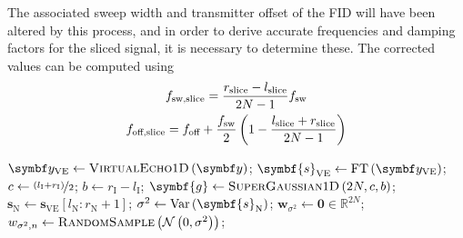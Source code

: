 The associated sweep width and transmitter offset of the \ac{FID} will have
been altered by this process, and in order to derive accurate frequencies and
damping factors for the sliced signal, it is necessary to determine these. The
corrected values can be computed using
\begin{subequations}
    \begin{gather}
        f_{\text{sw,slice}} = \frac{r_{\text{slice}} - l_{\text{slice}}}{2N - 1} f_{\mathrm{sw}}\\
        f_{\text{off,slice}} = f_{\text{off}} + \frac{f_{\mathrm{sw}}}{2} \left(
            1 - \frac{l_{\text{slice}} + r_{\text{slice}}}{2N - 1}
        \right)
    \end{gather}
\end{subequations}

\begin{algorithm}
    \begin{algorithmic}
        \caption[
            The filtering procedure for 1D data.
        ]
        {
            The filtering procedure for 1D data.
            $l/r_{\text{I/N}}$ denotes the left ($l$)/right ($r$) bound of the
            region of interest (I)/noise region (N), as a vector index.
            All of these values should be members of the set $\lbrace 0,
            \cdots, 2N - 1 \rbrace$.
            These would typically be provided in units of \unit{\hertz} or
            \unit{\partspermillion} by a user; conversion to indices can
            be carried out using \cref{eq:fidx}.
        }
        \label{alg:filter-1d}
            \State $\by_{\text{VE}} \gets \textsc{VirtualEcho$1$D}\left(\by\right)$;
            \State $\symbf{s}_{\text{VE}} \gets \FT\left(\by_{\text{VE}}\right)$;
            \State $c \gets \nicefrac{\left(l_{\text{I}} + r_{\text{I}}\right)}{2}$;
            \State $b \gets r_{\text{I}} - l_{\text{I}}$;
            \State $\symbf{g} \gets \textsc{SuperGaussian$1$D}\left(2N, c, b\right)$;
            \State $\symbf{s}_{\text{N}} \gets \symbf{s}_{\text{VE}} \left[
                l_{\text{N}} : r_{\text{N}} + 1
            \right]
            $;
            \State $\sigma^2 \gets \Var\left(\symbf{s}_{\text{N}}\right)$;
            \State $\symbf{w}_{\sigma^2} \gets \symbf{0} \in \mathbb{R}^{2N}$;
            \State $w_{\sigma^2,n} \gets \textsc{RandomSample}\left(\mathcal{N}\left(0, \sigma^2\right)\right)$;

\end{algorithmic}
\end{algorithm}
